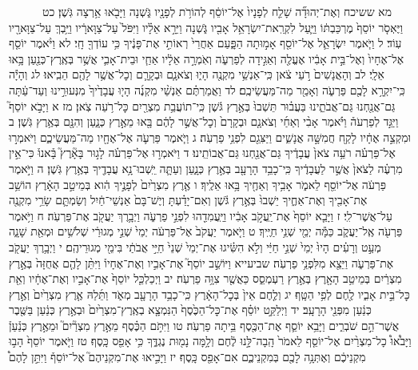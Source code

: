 \documentclass[twoside, openany, parskip=half, 11pt]{book}
\begin{document}
　　　מא ששיכח וְאֶת־יְהוּדָ֞ה שָׁלַ֤ח לְפָנָיו֙ אֶל־יוֹסֵ֔ף לְהוֹרֹ֥ת לְפָנָ֖יו גֹּ֑שְׁנָה וַיָּבֹ֖אוּ אַ֥רְצָה גֹּֽשֶׁן׃ כט וַיֶּאְסֹ֤ר יוֹסֵף֙ מֶרְכַּבְתּ֔וֹ וַיַּ֛עַל לִקְרַֽאת־יִשְׂרָאֵ֥ל אָבִ֖יו גֹּ֑שְׁנָה וַיֵּרָ֣א אֵלָ֗יו וַיִּפֹּל֙ עַל־צַוָּארָ֔יו וַיֵּ֥בְךְּ עַל־צַוָּארָ֖יו עֽוֹד׃ ל וַיֹּ֧אמֶר יִשְׂרָאֵ֛ל אֶל־יוֹסֵ֖ף אָמ֣וּתָה הַפָּ֑עַם אַחֲרֵי֙ רְאוֹתִ֣י אֶת־פָּנֶ֔יךָ כִּ֥י עוֹדְךָ֖ חָֽי׃ לא וַיֹּ֨אמֶר יוֹסֵ֤ף אֶל־אֶחָיו֙ וְאֶל־בֵּ֣ית אָבִ֔יו אֶעֱלֶ֖ה וְאַגִּ֣ידָה לְפַרְעֹ֑ה וְאֹֽמְרָ֣ה אֵלָ֔יו אַחַ֧י וּבֵית־אָבִ֛י אֲשֶׁ֥ר בְּאֶֽרֶץ־כְּנַ֖עַן בָּ֥אוּ אֵלָֽי׃ לב וְהָאֲנָשִׁים֙ רֹ֣עֵי צֹ֔אן כִּֽי־אַנְשֵׁ֥י מִקְנֶ֖ה הָי֑וּ וְצֹאנָ֧ם וּבְקָרָ֛ם וְכׇל־אֲשֶׁ֥ר לָהֶ֖ם הֵבִֽיאוּ׃ לג וְהָיָ֕ה כִּֽי־יִקְרָ֥א לָכֶ֖ם פַּרְעֹ֑ה וְאָמַ֖ר מַה־מַּעֲשֵׂיכֶֽם׃ לד וַאֲמַרְתֶּ֗ם אַנְשֵׁ֨י מִקְנֶ֜ה הָי֤וּ עֲבָדֶ֙יךָ֙ מִנְּעוּרֵ֣ינוּ וְעַד־עַ֔תָּה גַּם־אֲנַ֖חְנוּ גַּם־אֲבֹתֵ֑ינוּ בַּעֲב֗וּר תֵּשְׁבוּ֙ בְּאֶ֣רֶץ גֹּ֔שֶׁן כִּֽי־תוֹעֲבַ֥ת מִצְרַ֖יִם כׇּל־רֹ֥עֵה צֹֽאן׃ מז א וַיָּבֹ֣א יוֹסֵף֮ וַיַּגֵּ֣ד לְפַרְעֹה֒ וַיֹּ֗אמֶר אָבִ֨י וְאַחַ֜י וְצֹאנָ֤ם וּבְקָרָם֙ וְכׇל־אֲשֶׁ֣ר לָהֶ֔ם בָּ֖אוּ מֵאֶ֣רֶץ כְּנָ֑עַן וְהִנָּ֖ם בְּאֶ֥רֶץ גֹּֽשֶׁן׃ ב וּמִקְצֵ֣ה אֶחָ֔יו לָקַ֖ח חֲמִשָּׁ֣ה אֲנָשִׁ֑ים וַיַּצִּגֵ֖ם לִפְנֵ֥י פַרְעֹֽה׃ ג וַיֹּ֧אמֶר פַּרְעֹ֛ה אֶל־אֶחָ֖יו מַה־מַּעֲשֵׂיכֶ֑ם וַיֹּאמְר֣וּ אֶל־פַּרְעֹ֗ה רֹעֵ֥ה צֹאן֙ עֲבָדֶ֔יךָ גַּם־אֲנַ֖חְנוּ גַּם־אֲבוֹתֵֽינוּ׃ ד וַיֹּאמְר֣וּ אֶל־פַּרְעֹ֗ה לָג֣וּר בָּאָ֘רֶץ֮ בָּ֒אנוּ֒ כִּי־אֵ֣ין מִרְעֶ֗ה לַצֹּאן֙ אֲשֶׁ֣ר לַעֲבָדֶ֔יךָ כִּֽי־כָבֵ֥ד הָרָעָ֖ב בְּאֶ֣רֶץ כְּנָ֑עַן וְעַתָּ֛ה יֵֽשְׁבוּ־נָ֥א עֲבָדֶ֖יךָ בְּאֶ֥רֶץ גֹּֽשֶׁן׃ ה וַיֹּ֣אמֶר פַּרְעֹ֔ה אֶל־יוֹסֵ֖ף לֵאמֹ֑ר אָבִ֥יךָ וְאַחֶ֖יךָ בָּ֥אוּ אֵלֶֽיךָ׃ ו אֶ֤רֶץ מִצְרַ֙יִם֙ לְפָנֶ֣יךָ הִ֔וא בְּמֵיטַ֣ב הָאָ֔רֶץ הוֹשֵׁ֥ב אֶת־אָבִ֖יךָ וְאֶת־אַחֶ֑יךָ יֵשְׁבוּ֙ בְּאֶ֣רֶץ גֹּ֔שֶׁן וְאִם־יָדַ֗עְתָּ וְיֶשׁ־בָּם֙ אַנְשֵׁי־חַ֔יִל וְשַׂמְתָּ֛ם שָׂרֵ֥י מִקְנֶ֖ה עַל־אֲשֶׁר־לִֽי׃ ז וַיָּבֵ֤א יוֹסֵף֙ אֶת־יַֽעֲקֹ֣ב אָבִ֔יו וַיַּֽעֲמִדֵ֖הוּ לִפְנֵ֣י פַרְעֹ֑ה וַיְבָ֥רֶךְ יַעֲקֹ֖ב אֶת־פַּרְעֹֽה׃ ח וַיֹּ֥אמֶר פַּרְעֹ֖ה אֶֽל־יַעֲקֹ֑ב כַּמָּ֕ה יְמֵ֖י שְׁנֵ֥י חַיֶּֽיךָ׃ ט וַיֹּ֤אמֶר יַעֲקֹב֙ אֶל־פַּרְעֹ֔ה יְמֵי֙ שְׁנֵ֣י מְגוּרַ֔י שְׁלֹשִׁ֥ים וּמְאַ֖ת שָׁנָ֑ה מְעַ֣ט וְרָעִ֗ים הָיוּ֙ יְמֵי֙ שְׁנֵ֣י חַיַּ֔י וְלֹ֣א הִשִּׂ֗יגוּ אֶת־יְמֵי֙ שְׁנֵי֙ חַיֵּ֣י אֲבֹתַ֔י בִּימֵ֖י מְגוּרֵיהֶֽם׃ י וַיְבָ֥רֶךְ יַעֲקֹ֖ב אֶת־פַּרְעֹ֑ה וַיֵּצֵ֖א מִלִּפְנֵ֥י פַרְעֹֽה׃ שביעייא וַיּוֹשֵׁ֣ב יוֹסֵף֮ אֶת־אָבִ֣יו וְאֶת־אֶחָיו֒ וַיִּתֵּ֨ן לָהֶ֤ם אֲחֻזָּה֙ בְּאֶ֣רֶץ מִצְרַ֔יִם בְּמֵיטַ֥ב הָאָ֖רֶץ בְּאֶ֣רֶץ רַעְמְסֵ֑ס כַּאֲשֶׁ֖ר צִוָּ֥ה פַרְעֹֽה׃ יב וַיְכַלְכֵּ֤ל יוֹסֵף֙ אֶת־אָבִ֣יו וְאֶת־אֶחָ֔יו וְאֵ֖ת כׇּל־בֵּ֣ית אָבִ֑יו לֶ֖חֶם לְפִ֥י הַטָּֽף׃ יג וְלֶ֤חֶם אֵין֙ בְּכׇל־הָאָ֔רֶץ כִּֽי־כָבֵ֥ד הָרָעָ֖ב מְאֹ֑ד וַתֵּ֜לַהּ אֶ֤רֶץ מִצְרַ֙יִם֙ וְאֶ֣רֶץ כְּנַ֔עַן מִפְּנֵ֖י הָרָעָֽב׃ יד וַיְלַקֵּ֣ט יוֹסֵ֗ף אֶת־כׇּל־הַכֶּ֙סֶף֙ הַנִּמְצָ֤א בְאֶֽרֶץ־מִצְרַ֙יִם֙ וּבְאֶ֣רֶץ כְּנַ֔עַן בַּשֶּׁ֖בֶר אֲשֶׁר־הֵ֣ם שֹׁבְרִ֑ים וַיָּבֵ֥א יוֹסֵ֛ף אֶת־הַכֶּ֖סֶף בֵּ֥יתָה פַרְעֹֽה׃ טו וַיִּתֹּ֣ם הַכֶּ֗סֶף מֵאֶ֣רֶץ מִצְרַ֘יִם֮ וּמֵאֶ֣רֶץ כְּנַ֒עַן֒ וַיָּבֹ֩אוּ֩ כָל־מִצְרַ֨יִם אֶל־יוֹסֵ֤ף לֵאמֹר֙ הָֽבָה־לָּ֣נוּ לֶ֔חֶם וְלָ֥מָּה נָמ֖וּת נֶגְדֶּ֑ךָ כִּ֥י אָפֵ֖ס כָּֽסֶף׃ טז וַיֹּ֤אמֶר יוֹסֵף֙ הָב֣וּ מִקְנֵיכֶ֔ם וְאֶתְּנָ֥ה לָכֶ֖ם בְּמִקְנֵיכֶ֑ם אִם־אָפֵ֖ס כָּֽסֶף׃ יז וַיָּבִ֣יאוּ אֶת־מִקְנֵיהֶם֮ אֶל־יוֹסֵף֒ וַיִּתֵּ֣ן לָהֶם֩ 
\end{document}
